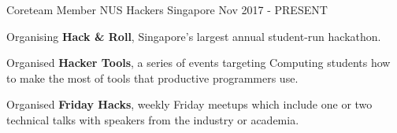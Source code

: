 

\begin{cventries}

  \cventry
  {Coreteam Member} %
  {NUS Hackers} %
  {Singapore} %
  {Nov 2017 - PRESENT} %
  {
    \begin{cvitems} %
      \item {Organising \textbf{Hack \& Roll}, Singapore's largest annual student-run hackathon.}
      \item {Organised \textbf{Hacker Tools}, a series of events targeting Computing students how to make the most of tools that productive programmers use.}
      \item {Organised \textbf{Friday Hacks}, weekly Friday meetups which include one or two technical talks with speakers from the industry or academia.}
    \end{cvitems}
  }


\end{cventries}
